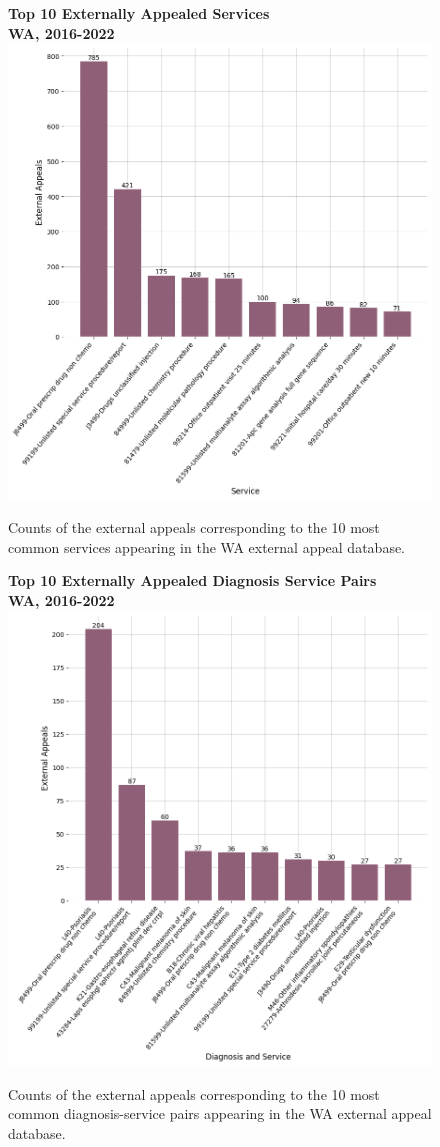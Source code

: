 \documentclass[12pt, a4paper,twoside,parskip=full]{report}
\theoremstyle{plain} %
\theoremstyle{definition} %
\theoremstyle{remark} %
\numberwithin{equation}{chapter}
\begin{document}
		
		\begin{figure}[h!]
			\centering
			\textbf{Top 10 Externally Appealed Services}\\
			\textbf{WA, 2016-2022}\\
			\includegraphics[width=.8\textwidth]{images/wa_external_appeals/top_externally_appealed_treatments.png}
			\caption{Counts of the external appeals corresponding to the 10 most common services appearing in the WA external appeal database.}
			\label{waexternalappealsbyservice}
		\end{figure}
	\clearpage
		
		\begin{figure}[h!]
			\centering
			\textbf{Top 10 Externally Appealed Diagnosis Service Pairs}\\
			\textbf{WA, 2016-2022}\\
			\includegraphics[width=.8\textwidth]{images/wa_external_appeals/top_externally_appealed_diag_treatments.png}
			\caption{Counts of the external appeals corresponding to the 10 most common diagnosis-service pairs appearing in the WA external appeal database.}
			\label{waexternalappealsbydiagservice}
		\end{figure}
	\clearpage
	
\end{document}
